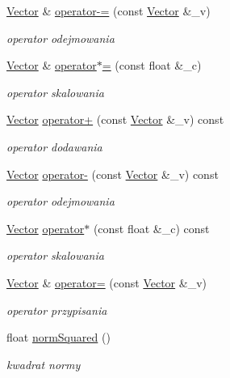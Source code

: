 \begin{DoxyCompactItemize}
\hyperlink{class_vector}{Vector} \& \hyperlink{class_vector_aaaf87dbf15cd9492aa0c11874ae5afef}{operator-\/=} (const \hyperlink{class_vector}{Vector} \&\+\_\+v)
\begin{DoxyCompactList}\small\item\em operator odejmowania \end{DoxyCompactList}\item 
\hyperlink{class_vector}{Vector} \& \hyperlink{class_vector_a91ebac6d502ca1d54645e7c711549867}{operator$\ast$=} (const float \&\+\_\+c)
\begin{DoxyCompactList}\small\item\em operator skalowania \end{DoxyCompactList}\item 
\hyperlink{class_vector}{Vector} \hyperlink{class_vector_aa78eb4c9e5ac236c89f0853eefa347ac}{operator+} (const \hyperlink{class_vector}{Vector} \&\+\_\+v) const 
\begin{DoxyCompactList}\small\item\em operator dodawania \end{DoxyCompactList}\item 
\hyperlink{class_vector}{Vector} \hyperlink{class_vector_a94b6fde82bef6532c00358a0af448fc1}{operator-\/} (const \hyperlink{class_vector}{Vector} \&\+\_\+v) const 
\begin{DoxyCompactList}\small\item\em operator odejmowania \end{DoxyCompactList}\item 
\hyperlink{class_vector}{Vector} \hyperlink{class_vector_a8f0e64ee9a688803b1efce30fb0b2869}{operator$\ast$} (const float \&\+\_\+c) const 
\begin{DoxyCompactList}\small\item\em operator skalowania \end{DoxyCompactList}\item 
\hyperlink{class_vector}{Vector} \& \hyperlink{class_vector_ad44f6d9721d9584e7f847e449df73e11}{operator=} (const \hyperlink{class_vector}{Vector} \&\+\_\+v)
\begin{DoxyCompactList}\small\item\em operator przypisania \end{DoxyCompactList}\item 
float \hyperlink{class_vector_a18d3f2110be751ac3a658016bd3dca69}{norm\+Squared} ()
\begin{DoxyCompactList}\small\item\em kwadrat normy \end{DoxyCompactList}\end{DoxyCompactItemize}
